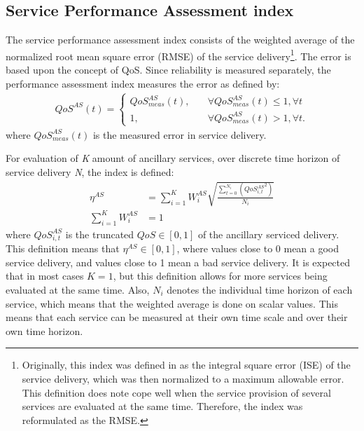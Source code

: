 \subsection{Service Performance Assessment index}
The service performance assessment index consists of the weighted average of the normalized root mean square error (RMSE) of the service delivery\footnote{Originally, this index was defined in \cite{bondy2014performance} as the integral square error (ISE) of the service delivery, which was then normalized to a maximum allowable error. This definition does note cope well when the service provision of several services are evaluated at the same time. Therefore, the index was reformulated as the RMSE.}.
The error is based upon the concept of QoS. Since reliability is measured separately, the performance assessment index measures the error as defined by:
\begin{align}
	QoS^{AS}(t) = \begin{cases} QoS^{AS}_{meas}(t) ,\quad &\forall QoS^{AS}_{meas}(t) \leq 1, \forall t\\
	1, \quad &\forall QoS^{AS}_{meas}(t) > 1, \forall t.
	\end{cases}
\end{align}
where $QoS^{AS}_{meas}(t)$ is the measured error in service delivery.

For evaluation of \emph{K} amount of ancillary services, over discrete time horizon of service delivery \emph{N}, the index is defined:
\begin{align}\label{eq:MAINetaAS}
\eta^{AS} &= \sum^{K}_{i=1} W^{AS}_i \sqrt{\frac{\sum^{N_i}_{t=0} \left( {QoS^{AS}_{i,t}}^{2} \right)}{N_i}}\\
\sum_{i=1}^K W^{AS}_i &= 1 \label{eq:was}
\end{align}
where $QoS^{AS}_{i,t}$ is the truncated $QoS \in [0,1]$ of the ancillary serviced delivery. This definition means that $\eta^{AS} \in [0,1]$, where values close to 0 mean a good service delivery, and values close to 1 mean a bad service delivery. It is expected that in most cases $K=1$, but this definition allows for more services being evaluated at the same time. Also, $N_i$ denotes the individual time horizon of each service, which means that the weighted average is done on scalar values. This means that each service can be measured at their own time scale and over their own time horizon. 

